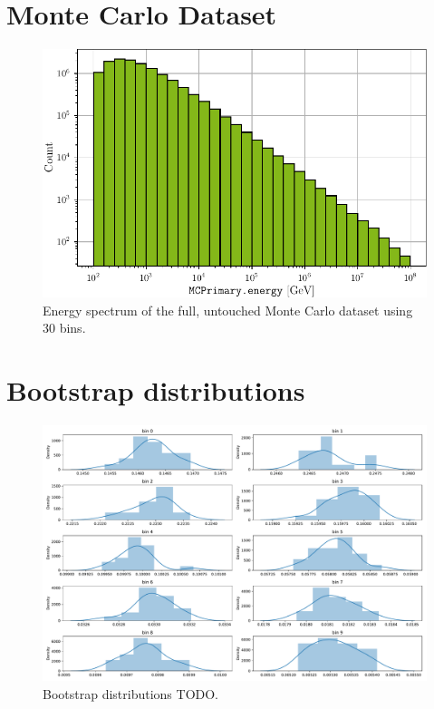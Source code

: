 \section{Monte Carlo Dataset}
\begin{figure}
  \centering
  \includegraphics[scale=1]{content/plots/dataset:raw:histogram_full.pdf}
  \caption{Energy spectrum of the full, untouched Monte Carlo dataset using 30 bins.}
  \label{fig:dataset:raw:histogram}
\end{figure}


\section{Bootstrap distributions}
\begin{figure}
  \centering
  \includegraphics[width=\textwidth]{content/plots/halftime/bootstrap_distributions.pdf}
  \caption{Bootstrap distributions TODO.}
  \label{fig:bootstrap:distributions}
\end{figure}


